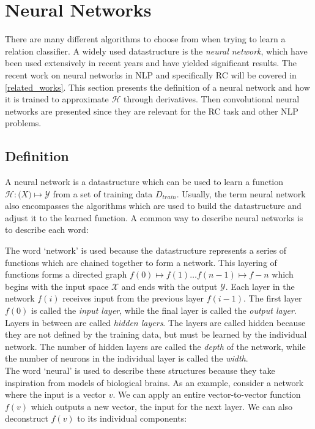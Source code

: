 \section{Neural Networks}

There are many different algorithms to choose from when trying to learn a relation classifier. A widely used datastructure is the \emph{neural network}, which have been used extensively in recent years and have yielded significant results. The recent work on neural networks in NLP and specifically RC will be covered in \autoref{related_works}. This section presents the definition of a neural network and how it is trained to approximate $\mathcal{H}$ through derivatives. Then convolutional neural networks are presented since they are relevant for the RC task and other NLP problems.    

\subsection{Definition}

A neural network is a datastructure which can be used to learn a function $\mathcal{H} : \mathcal(X) \mapsto \mathcal{Y}$ from a set of training data $D_{train}$. Usually, the term neural network also encompasses the algorithms which are used to build the datastructure and adjust it to the learned function. A common way to describe neural networks is to describe each word:

The word `network' is used because the datastructure represents a series of functions which are chained together to form a network. This layering of functions forms a directed graph $f(0) \mapsto f(1) \ldots f(n-1) \mapsto {f-n}$ which begins with the input space $\mathcal{X}$ and ends with the output $\mathcal{Y}$.  
Each layer in the network $f(i)$ receives input from the previous layer $f(i-1)$. The first layer $f(0)$ is called the \emph{input layer}, while the final layer is called the \emph{output layer}. Layers in between are called \emph{hidden layers}. The layers are called hidden because they are not defined by the training data, but must be learned by the individual network\citep[chapter 6]{dl_book}. The number of hidden layers are called the \emph{depth} of the network, while the number of neurons in the individual layer is called the \emph{width}. \\

The word `neural' is used to describe these structures because they take inspiration from models of biological brains. As an example, consider a network where the input is a vector $v$. We can apply an entire vector-to-vector function $f(v)$ which outputs a new vector, the input for the next layer. We can also deconstruct $f(v)$ to its individual components:

